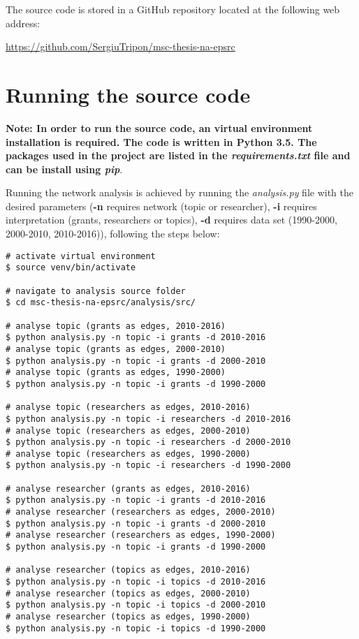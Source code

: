 The source code is stored in a GitHub repository located at the following web address:

\url{https://github.com/SergiuTripon/msc-thesis-na-epsrc}

\section{Running the source code}

\textbf{Note: In order to run the source code, an virtual environment installation is required. The code is written in Python 3.5. The packages used in the project are listed in the \textit{requirements.txt} file and can be install using \textit{pip}}.

\vspace{1em}

\noindent Running the network analysis is achieved by running the \textit{analysis.py} file with the desired parameters (\textbf{-n} requires network (topic or researcher), \textbf{-i} requires interpretation (grants, researchers or topics), \textbf{-d} requires data set (1990-2000, 2000-2010, 2010-2016)), following the steps below:

\begin{lstlisting}[style=Bash]
# activate virtual environment
$ source venv/bin/activate

# navigate to analysis source folder
$ cd msc-thesis-na-epsrc/analysis/src/

# analyse topic (grants as edges, 2010-2016)
$ python analysis.py -n topic -i grants -d 2010-2016
# analyse topic (grants as edges, 2000-2010)
$ python analysis.py -n topic -i grants -d 2000-2010
# analyse topic (grants as edges, 1990-2000)
$ python analysis.py -n topic -i grants -d 1990-2000

# analyse topic (researchers as edges, 2010-2016)
$ python analysis.py -n topic -i researchers -d 2010-2016
# analyse topic (researchers as edges, 2000-2010)
$ python analysis.py -n topic -i researchers -d 2000-2010
# analyse topic (researchers as edges, 1990-2000)
$ python analysis.py -n topic -i researchers -d 1990-2000

# analyse researcher (grants as edges, 2010-2016)
$ python analysis.py -n topic -i grants -d 2010-2016
# analyse researcher (researchers as edges, 2000-2010)
$ python analysis.py -n topic -i grants -d 2000-2010
# analyse researcher (researchers as edges, 1990-2000)
$ python analysis.py -n topic -i grants -d 1990-2000

# analyse researcher (topics as edges, 2010-2016)
$ python analysis.py -n topic -i topics -d 2010-2016
# analyse researcher (topics as edges, 2000-2010)
$ python analysis.py -n topic -i topics -d 2000-2010
# analyse researcher (topics as edges, 1990-2000)
$ python analysis.py -n topic -i topics -d 1990-2000
\end{lstlisting}

